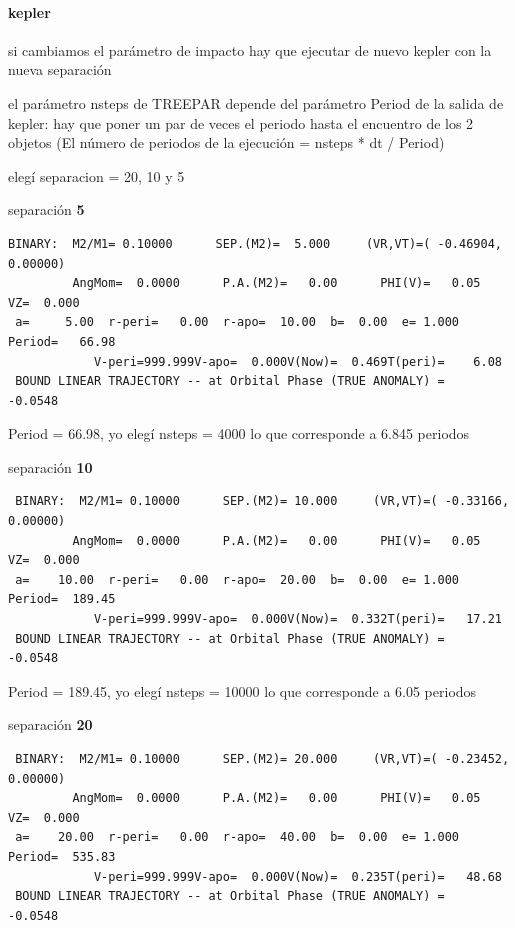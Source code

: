 \documentclass[12pt]{article} %
\renewcommand{\=}[1]{\stackrel{#1}{=}} %
\theoremstyle{definition}
\theoremstyle{remark}
\begin{document}
\paragraph{kepler}
\begin{description}
\item  si cambiamos el parámetro de impacto hay que ejecutar de nuevo kepler con la nueva separación
\item el parámetro nsteps de TREEPAR depende del parámetro Period de la salida de kepler: hay que poner un par de veces el periodo hasta el encuentro de los 2 objetos (El número de periodos de la ejecución = nsteps * dt / Period)
\item elegí separacion = 20, 10 y 5
\item separación \textbf{5}
\begin{verbatim}
BINARY:  M2/M1= 0.10000      SEP.(M2)=  5.000     (VR,VT)=( -0.46904,  0.00000)
         AngMom=  0.0000      P.A.(M2)=   0.00      PHI(V)=   0.05    VZ=  0.000
 a=     5.00  r-peri=   0.00  r-apo=  10.00  b=  0.00  e= 1.000  Period=   66.98
            V-peri=999.999V-apo=  0.000V(Now)=  0.469T(peri)=    6.08
 BOUND LINEAR TRAJECTORY -- at Orbital Phase (TRUE ANOMALY) =   -0.0548
\end{verbatim}
\item Period = 66.98, yo elegí nsteps = 4000 lo que corresponde a 6.845 periodos
\item separación \textbf{10}
\begin{verbatim}
 BINARY:  M2/M1= 0.10000      SEP.(M2)= 10.000     (VR,VT)=( -0.33166,  0.00000)
         AngMom=  0.0000      P.A.(M2)=   0.00      PHI(V)=   0.05    VZ=  0.000
 a=    10.00  r-peri=   0.00  r-apo=  20.00  b=  0.00  e= 1.000  Period=  189.45
            V-peri=999.999V-apo=  0.000V(Now)=  0.332T(peri)=   17.21
 BOUND LINEAR TRAJECTORY -- at Orbital Phase (TRUE ANOMALY) =   -0.0548
\end{verbatim}

\item Period = 189.45, yo elegí nsteps = 10000 lo que corresponde a 6.05 periodos

\item separación \textbf{20}
\begin{verbatim}
 BINARY:  M2/M1= 0.10000      SEP.(M2)= 20.000     (VR,VT)=( -0.23452,  0.00000)
         AngMom=  0.0000      P.A.(M2)=   0.00      PHI(V)=   0.05    VZ=  0.000
 a=    20.00  r-peri=   0.00  r-apo=  40.00  b=  0.00  e= 1.000  Period=  535.83
            V-peri=999.999V-apo=  0.000V(Now)=  0.235T(peri)=   48.68
 BOUND LINEAR TRAJECTORY -- at Orbital Phase (TRUE ANOMALY) =   -0.0548


\end{verbatim}
\end{description}
\end{document}
